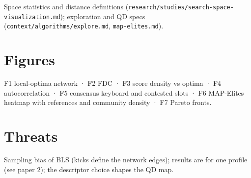 \documentclass{gecko-paper}
\begin{document}
\begin{paperbody}
Space statistics and distance definitions
(\texttt{research/studies/search-space-visualization.md}); exploration
and QD specs (\texttt{context/algorithms/explore.md},
\texttt{map-elites.md}).

\section{Figures}

F1 local-optima network · F2 FDC · F3 score density vs optima · F4
autocorrelation · F5 consensus keyboard and contested slots · F6
MAP-Elites heatmap with references and community density · F7 Pareto
fronts.

\section{Threats}

Sampling bias of BLS (kicks define the network edges); results are for
one profile (see paper 2); the descriptor choice shapes the QD map.

\end{paperbody}
\end{document}
